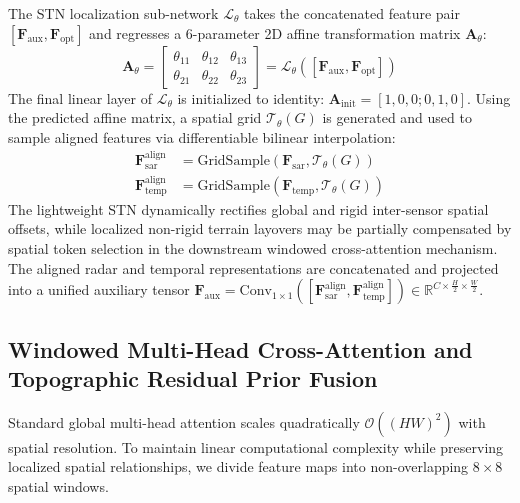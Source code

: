 The STN localization sub-network $\mathcal{L}_{\theta}$ takes the concatenated feature pair $[\mathbf{F}_{\text{aux}}, \mathbf{F}_{\text{opt}}]$ and regresses a 6-parameter 2D affine transformation matrix $\mathbf{A}_{\theta}$:
\begin{equation}
    \mathbf{A}_{\theta} = \begin{bmatrix} \theta_{11} & \theta_{12} & \theta_{13} \\ \theta_{21} & \theta_{22} & \theta_{23} \end{bmatrix} = \mathcal{L}_{\theta}([\mathbf{F}_{\text{aux}}, \mathbf{F}_{\text{opt}}])
\end{equation}
The final linear layer of $\mathcal{L}_{\theta}$ is initialized to identity: $\mathbf{A}_{\text{init}} = [1, 0, 0; 0, 1, 0]$. Using the predicted affine matrix, a spatial grid $\mathcal{T}_{\theta}(G)$ is generated and used to sample aligned features via differentiable bilinear interpolation:
\begin{align}
    \mathbf{F}_{\text{sar}}^{\text{align}} &= \text{GridSample}(\mathbf{F}_{\text{sar}}, \mathcal{T}_{\theta}(G)) \\
    \mathbf{F}_{\text{temp}}^{\text{align}} &= \text{GridSample}(\mathbf{F}_{\text{temp}}, \mathcal{T}_{\theta}(G))
\end{align}
The lightweight STN dynamically rectifies global and rigid inter-sensor spatial offsets, while localized non-rigid terrain layovers may be partially compensated by spatial token selection in the downstream windowed cross-attention mechanism. The aligned radar and temporal representations are concatenated and projected into a unified auxiliary tensor $\mathbf{F}_{\text{aux}} = \text{Conv}_{1\times 1}([\mathbf{F}_{\text{sar}}^{\text{align}}, \mathbf{F}_{\text{temp}}^{\text{align}}]) \in \mathbb{R}^{C \times \frac{H}{2} \times \frac{W}{2}}$.

\subsection{Windowed Multi-Head Cross-Attention and Topographic Residual Prior Fusion}
Standard global multi-head attention scales quadratically $\mathcal{O}((HW)^2)$ with spatial resolution. To maintain linear computational complexity while preserving localized spatial relationships, we divide feature maps into non-overlapping $8\times 8$ spatial windows.


